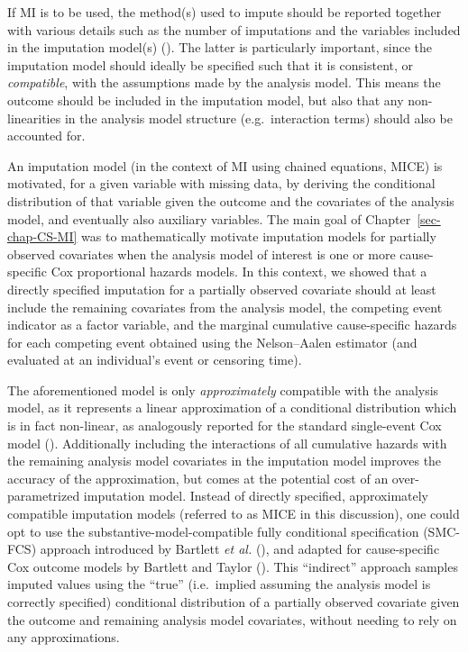\documentclass[
  letterpaper,
  paper=240mm:170mm,
  twoside=true,
  open=right,
  fontsize=10pt,
  pagesize=false,
  BCOR=15mm,
  DIV=14,
  headinclude=true,
  footinclude=false,
  headsepline=on]{scrbook}
\begin{document}
If MI is to be used, the method(s) used to impute should be reported
together with various details such as the number of imputations and the
variables included in the imputation model(s)
(). The latter is particularly important, since the imputation
model should ideally be specified such that it is consistent, or
\emph{compatible}, with the assumptions made by the analysis model. This
means the outcome should be included in the imputation model, but also
that any non-linearities in the analysis model structure
(e.g.~interaction terms) should also be accounted for.

An imputation model (in the context of MI using chained equations, MICE)
is motivated, for a given variable with missing data, by deriving the
conditional distribution of that variable given the outcome and the
covariates of the analysis model, and eventually also auxiliary
variables. The main goal of Chapter~\ref{sec-chap-CS-MI} was to
mathematically motivate imputation models for partially observed
covariates when the analysis model of interest is one or more
cause-specific Cox proportional hazards models. In this context, we
showed that a directly specified imputation for a partially observed
covariate should at least include the remaining covariates from the
analysis model, the competing event indicator as a factor variable, and
the marginal cumulative cause-specific hazards for each competing event
obtained using the Nelson--Aalen estimator (and evaluated at an
individual's event or censoring time).

The aforementioned model is only \emph{approximately} compatible with
the analysis model, as it represents a linear approximation of a
conditional distribution which is in fact non-linear, as analogously
reported for the standard single-event Cox model
(). Additionally including the interactions of all cumulative
hazards with the remaining analysis model covariates in the imputation
model improves the accuracy of the approximation, but comes at the
potential cost of an over-parametrized imputation model. Instead of
directly specified, approximately compatible imputation models (referred
to as MICE in this discussion), one could opt to use the
substantive-model-compatible fully conditional specification (SMC-FCS)
approach introduced by Bartlett \emph{et al.}
(), and
adapted for cause-specific Cox outcome models by Bartlett and Taylor
(). This
``indirect'' approach samples imputed values using the ``true''
(i.e.~implied assuming the analysis model is correctly specified)
conditional distribution of a partially observed covariate given the
outcome and remaining analysis model covariates, without needing to rely
on any approximations.
\end{document}
